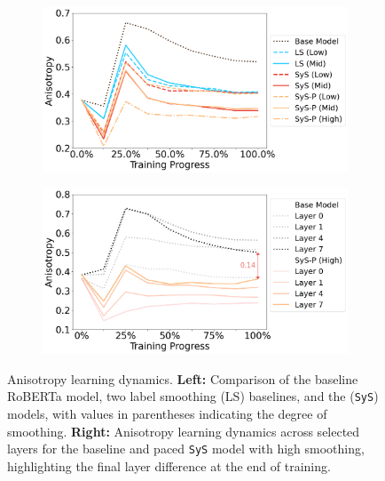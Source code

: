 \begin{figure}[ht!]
    \centering
    \begin{subfigure}[b]{0.49\textwidth}
        \centering
        \includegraphics[width=\textwidth]{chapters/syntatic-smoothing/figures/anisotropy-learning-dynamics.png}
        \label{fig:anisotropy-learing-dynamics}
    \end{subfigure}
    \hfill
    \begin{subfigure}[b]{0.49\textwidth}
        \centering
        \includegraphics[width=\textwidth]{chapters/syntatic-smoothing/figures/anisotropy-layers.png}
        \label{fig:anisotropy-layers}
    \end{subfigure}
    \caption{Anisotropy learning dynamics. \textbf{Left:} Comparison of the baseline RoBERTa model, two label smoothing (LS) baselines, and the \smoothing (\texttt{SyS}) models, with values in parentheses indicating the degree of smoothing. \textbf{Right:} Anisotropy learning dynamics across selected layers for the baseline and paced \texttt{SyS} model with high smoothing, highlighting the final layer difference at the end of training.}
    \label{fig:anisotropy-combined}
\end{figure}


